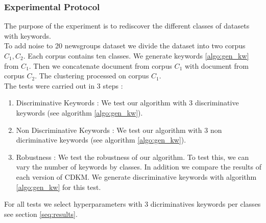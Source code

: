 \subsubsection{\label{seq:protocol}Experimental Protocol}
The purpose of the experiment is to rediscover the different classes of 
datasets with keywords.
\\To add noise to 20 newsgroups dataset we divide the dataset into two corpus 
$C_1, C_2$. Each corpus contains ten classes. We generate keywords 
\ref{algo:gen_kw} from $C_1$. Then we concatenate document from corpus $C_1$
with document from corpus $C_2$. The clustering processed on corpus $C_1$.
\\The tests were carried out in 3 steps :
\begin{enumerate}
\item Discriminative Keywords : We test our algorithm with 3 discriminative 
keywords (see  algorithm \ref{algo:gen_kw}).
\item Non Discriminative Keywords : We test our algorithm with 3 non dicriminative 
keywords (see  algorithm \ref{algo:gen_kw}).
\item Robustness : We test the robustness of our algorithm. To test this, we
can vary the number of keywords by classes. In addition we compare
the results of each version of CDKM. We generate discriminative keywords with 
algorithm \ref{algo:gen_kw} for this test.
\end{enumerate}
For all tests we select hyperparameters with 3 dicriminatives keywords per 
classes see section \ref{seq:results}. 
